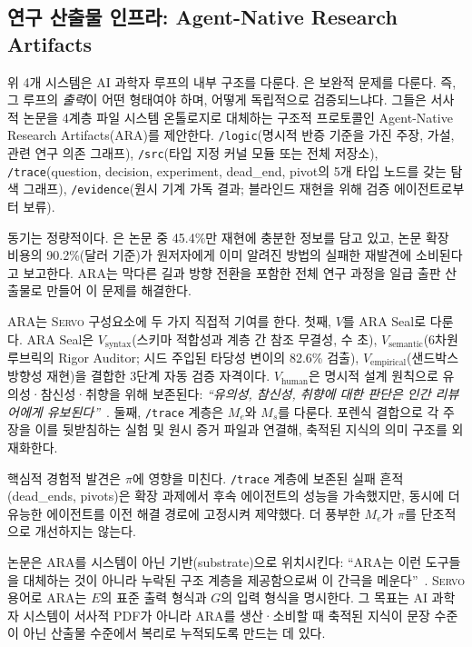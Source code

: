 \documentclass[11pt]{article}
\newcommand{\framework}{\textsc{Servo}}
\begin{document}
\subsection{연구 산출물 인프라: Agent-Native Research Artifacts}
\label{sec:ara}

위 4개 시스템은 AI 과학자 루프의 내부 구조를 다룬다. \citet{liu2026lasthuman}은 보완적 문제를 다룬다. 즉, 그 루프의 \emph{출력}이 어떤 형태여야 하며, 어떻게 독립적으로 검증되느냐다. 그들은 서사적 논문을 4계층 파일 시스템 온톨로지로 대체하는 구조적 프로토콜인 Agent-Native Research Artifacts(ARA)를 제안한다. \texttt{/logic}(명시적 반증 기준을 가진 주장, 가설, 관련 연구 의존 그래프), \texttt{/src}(타입 지정 커널 모듈 또는 전체 저장소), \texttt{/trace}(question, decision, experiment, dead\_end, pivot의 5개 타입 노드를 갖는 탐색 그래프), \texttt{/evidence}(원시 기계 가독 결과; 블라인드 재현을 위해 검증 에이전트로부터 보류).

동기는 정량적이다. \citet{liu2026lasthuman}은 논문 중 45.4\%만 재현에 충분한 정보를 담고 있고, 논문 확장 비용의 90.2\%(달러 기준)가 원저자에게 이미 알려진 방법의 실패한 재발견에 소비된다고 보고한다. ARA는 막다른 길과 방향 전환을 포함한 전체 연구 과정을 일급 출판 산출물로 만들어 이 문제를 해결한다.

ARA는 \framework{} 구성요소에 두 가지 직접적 기여를 한다. 첫째, $V$를 ARA Seal로 다룬다. ARA Seal은 $V_\text{syntax}$(스키마 적합성과 계층 간 참조 무결성, 수 초), $V_\text{semantic}$(6차원 루브릭의 Rigor Auditor; 시드 주입된 타당성 변이의 82.6\% 검출), $V_\text{empirical}$(샌드박스 방향성 재현)을 결합한 3단계 자동 검증 자격이다. $V_\text{human}$은 명시적 설계 원칙으로 유의성·참신성·취향을 위해 보존된다: \textit{``유의성, 참신성, 취향에 대한 판단은 인간 리뷰어에게 유보된다''}~\citep{liu2026lasthuman}. 둘째, \texttt{/trace} 계층은 $M_e$와 $M_s$를 다룬다. 포렌식 결합으로 각 주장을 이를 뒷받침하는 실험 및 원시 증거 파일과 연결해, 축적된 지식의 의미 구조를 외재화한다.

핵심적 경험적 발견은 $\pi$에 영향을 미친다. \texttt{/trace} 계층에 보존된 실패 흔적(dead\_ends, pivots)은 확장 과제에서 후속 에이전트의 성능을 가속했지만, 동시에 더 유능한 에이전트를 이전 해결 경로에 고정시켜 제약했다. 더 풍부한 $M_e$가 $\pi$를 단조적으로 개선하지는 않는다.

논문은 ARA를 시스템이 아닌 기반(substrate)으로 위치시킨다: ``ARA는 이런 도구들을 대체하는 것이 아니라 누락된 구조 계층을 제공함으로써 이 간극을 메운다''~\citep{liu2026lasthuman}. \framework{} 용어로 ARA는 $E$의 표준 출력 형식과 $G$의 입력 형식을 명시한다. 그 목표는 AI 과학자 시스템이 서사적 PDF가 아니라 ARA를 생산·소비할 때 축적된 지식이 문장 수준이 아닌 산출물 수준에서 복리로 누적되도록 만드는 데 있다.
\end{document}
